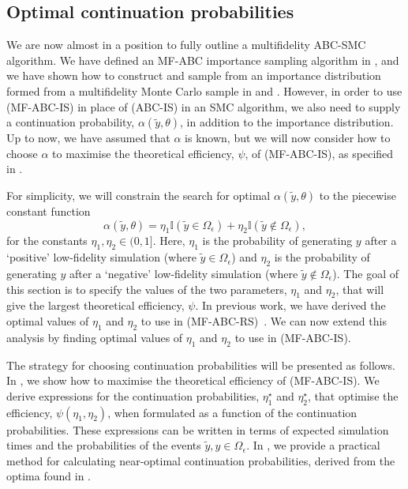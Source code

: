 \documentclass[review,demo]{siamonline190516}
\begin{document}
\subsection{Optimal continuation probabilities}
\label{s:eta}

We are now almost in a position to fully outline a multifidelity ABC-SMC algorithm.
We have defined an MF-ABC importance sampling algorithm in , and we have shown how to construct and sample from an importance distribution formed from a multifidelity Monte Carlo sample in  and .
However, in order to use  (MF-ABC-IS) in place of  (ABC-IS) in an SMC algorithm, we also need to supply a continuation probability, $\alpha(\tilde y, \theta)$, in addition to the importance distribution.
Up to now, we have assumed that $\alpha$ is known, but we will now consider how to choose $\alpha$ to maximise the theoretical efficiency, $\psi$, of  (MF-ABC-IS), as specified in .

For simplicity, we will constrain the search for optimal $\alpha(\tilde y, \theta)$ to the piecewise constant function
\begin{equation}
\label{eq:constantrates}
 \alpha(\tilde y, \theta) = \eta_1 \mathbb I(\tilde y \in \Omega_{\epsilon}) + \eta_2 \mathbb I(\tilde y \notin \Omega_{\epsilon}),
\end{equation}
for the constants $\eta_1, \eta_2 \in (0,1]$.
Here, $\eta_1$ is the probability of generating $y$ after a `positive' low-fidelity simulation (where $\tilde y \in \Omega_\epsilon$) and $\eta_2$ is the probability of generating $y$ after a `negative' low-fidelity simulation (where $\tilde y \notin \Omega_\epsilon$).
The goal of this section is to specify the values of the two parameters, $\eta_1$ and $\eta_2$, that will give the largest theoretical efficiency, $\psi$.
In previous work, we have derived the optimal values of $\eta_1$ and $\eta_2$ to use in  (MF-ABC-RS)~\cite{Prescott2020}.
We can now extend this analysis by finding optimal values of $\eta_1$ and $\eta_2$ to use in  (MF-ABC-IS).

The strategy for choosing continuation probabilities will be presented as follows.
In , we show how to maximise the theoretical efficiency of  (MF-ABC-IS).
We derive expressions for the continuation probabilities, $\eta_1^\star$ and $\eta_2^\star$, that optimise the efficiency, $\psi(\eta_1,\eta_2)$, when formulated as a function of the continuation probabilities.
These expressions can be written in terms of expected simulation times and the probabilities of the events $\tilde y, y \in \Omega_\epsilon$.
In , we provide a practical method for calculating near-optimal continuation probabilities, derived from the optima found in .
\end{document}
